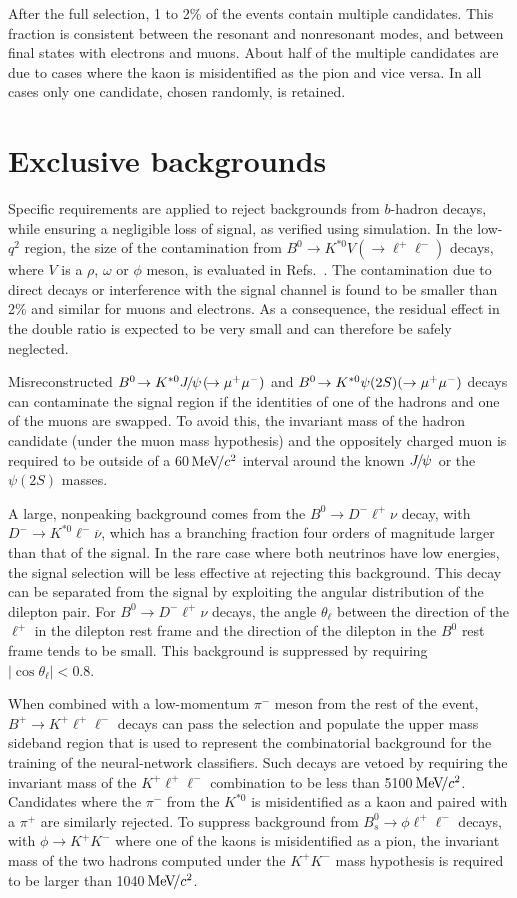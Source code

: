 \documentclass[12pt,a4paper]{article}
\def\lp       {\ensuremath{\ell^+ }\xspace}
\def\ln       {\ensuremath{\ell^- }\xspace}
\def\Ppi         {\ensuremath{\uppi}\xspace}
\def\Ppsi        {\ensuremath{\uppsi}\xspace}
\def\PB      {\ensuremath{\mathrm{B}}\xspace}
\def\PD      {\ensuremath{\mathrm{D}}\xspace}
\def\PJ      {\ensuremath{\mathrm{J}}\xspace}
\def\PK      {\ensuremath{\mathrm{K}}\xspace}
\def\Pb      {\ensuremath{\mathrm{b}}\xspace}
\def\Ps      {\ensuremath{\mathrm{s}}\xspace}
\def\Ppi         {\ensuremath{\pi}\xspace}
\def\Ppsi        {\ensuremath{\psi}\xspace}
\def\PB      {\ensuremath{B}\xspace}
\def\PD      {\ensuremath{D}\xspace}
\def\PJ      {\ensuremath{J}\xspace}
\def\PK      {\ensuremath{K}\xspace}
\def\Pb      {\ensuremath{b}\xspace}
\def\Ps      {\ensuremath{s}\xspace}
\def\ellm       {\ensuremath{\ell^-}\xspace}
\def\ellp       {\ensuremath{\ell^+}\xspace}
\def\squark    {\ensuremath{\Ps}\xspace}
\def\bquark    {\ensuremath{\Pb}\xspace}
\def\pion  {\ensuremath{\Ppi}\xspace}
\def\pip   {\ensuremath{\pion^+}\xspace}
\def\pim   {\ensuremath{\pion^-}\xspace}
\def\kaon  {\ensuremath{\PK}\xspace}
\def\Kp    {\ensuremath{\kaon^+}\xspace}
\def\Km    {\ensuremath{\kaon^-}\xspace}
\def\Kstarz  {\ensuremath{\kaon^{*0}}\xspace}
\def\D       {\ensuremath{\PD}\xspace}
\def\Dm      {\ensuremath{\D^-}\xspace}
\def\B       {\ensuremath{\PB}\xspace}
\def\Bz      {\ensuremath{\B^0}\xspace}
\def\Bu      {\ensuremath{\B^+}\xspace}
\def\Bd      {\ensuremath{\B^0}\xspace}
\def\Bs      {\ensuremath{\B^0_\squark}\xspace}
\def\jpsi     {\ensuremath{{\PJ\mskip -3mu/\mskip -2mu\Ppsi\mskip 2mu}}\xspace}
\def\psitwos  {\ensuremath{\Ppsi{(2S)}}\xspace}
\newcommand{\decay}[2]{\ensuremath{#1\!\to #2}\xspace}         \def\ra                 {\ensuremath{\rightarrow}\xspace}
\def\to                 {\ensuremath{\rightarrow}\xspace}
\def\qsq       {\ensuremath{q^2}\xspace}
\def\ctl       {\ensuremath{\cos{\theta_\ell}}\xspace}
\newcommand{\mevcc}{\ensuremath{{\mathrm{\,Me\kern -0.1em V\!/}c^2}}\xspace}
\def\lqsq{low-\qsq}
\def\ll{\ensuremath{\ellp\ellm}\xspace}
\def\ellell{\ensuremath{\ellp\ellm}\xspace}
\def\BdToKstVll{\mbox{\decay{\Bd}{\Kstarz V(\decay{}{\ll})}}\xspace}
\def\BdToKstJPsmm{\mbox{\decay{\Bd}{\Kstarz \jpsi(\decay{}{\mumu})}}\xspace}
\def\BdToKstPsimm{\mbox{\decay{\Bd}{\Kstarz \psitwos(\to\mumu)}}\xspace}
\def\BuToKll{\mbox{\decay{\Bu}{\Kp \ll}}\xspace}
\def\BsToPhill{\mbox{\decay{\Bs}{\phi\ll}}\xspace}
\begin{document}
After the full selection, 1 to 2\% of the events contain multiple candidates.
This fraction is consistent between the resonant and nonresonant modes, and between final states with electrons and muons.
About half of the multiple candidates are due to cases where the kaon is misidentified as the pion and vice versa.
In all cases only one candidate, chosen randomly, is retained. 


\section{Exclusive backgrounds}
\label{sec:backgrounds}

Specific requirements are applied to reject backgrounds from \bquark-hadron decays, while ensuring a negligible loss of signal, as verified using simulation.
In the \lqsq region, the size of the contamination from \BdToKstVll decays, where $V$ is a $\rho$, $\omega$ or $\phi$ meson, is evaluated in Refs.~\cite{Korchin:2010uc, Jager:2012uw}.
The contamination due to direct decays or interference with the signal channel is found to be smaller than 2\% and similar for muons and electrons.
As a consequence, the residual effect in the double ratio is expected to be very small and can therefore be safely neglected.

Misreconstructed \BdToKstJPsmm and \BdToKstPsimm decays can contaminate the signal region if the identities of one of the hadrons and one of the muons are swapped. To avoid this, the invariant mass of the hadron candidate (under the muon mass hypothesis) and the oppositely charged muon is required to be outside of a 60\mevcc interval around the known \jpsi or the \psitwos masses.

A large, nonpeaking background comes from the \mbox{\decay{\Bd}{\Dm \lp \nu}} decay, with \mbox{\decay{\Dm}{\Kstarz \ln \overline{\nu}}}, which has a 
branching fraction four orders of magnitude larger than that of the signal.
In the rare case where both neutrinos have low energies, the signal selection will be less effective at rejecting this background.
This decay can be separated from the signal by exploiting the angular distribution of the dilepton pair.
For \mbox{\decay{\Bd}{\Dm \lp \nu}} decays, the angle $\theta_\ell$ between the direction of the \lp in the dilepton rest frame and the direction of the dilepton in the \Bz rest frame tends to be small.
This background is suppressed by requiring \mbox{$|\ctl|<0.8$}. 

When combined with a low-momentum \pim meson from the rest of the event, \BuToKll  decays can pass the selection and populate the upper mass sideband region that is used to represent the combinatorial background for the training of the neural-network classifiers.
Such decays are vetoed by requiring the invariant mass of the $\Kp\ellell$ combination to be less than \mbox{5100\mevcc}.
Candidates where the \pim from the \Kstarz is misidentified as a kaon and paired with a \pip are similarly rejected.
To suppress background from \BsToPhill decays, with \mbox{\decay{\phi}{\Kp\Km}} where one of the kaons is misidentified as a pion, the invariant mass of the two hadrons computed under the $\Kp\Km$ mass hypothesis is required to be larger than 1040\mevcc.
 
\end{document}
